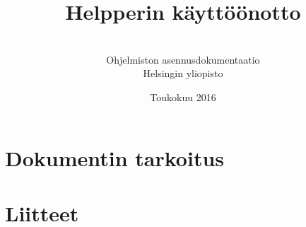 \documentclass[a4paper,12pt, titlepage]{article}
\title{Helpperin käyttöönotto}
\author{ \\[1cm] Ohjelmiston asennusdokumentaatio \\ Helsingin yliopisto}
\date{Toukokuu 2016}
\begin{document}
\maketitle

\tableofcontents

\section{Dokumentin tarkoitus}

\section{Liitteet}
\end{document}
